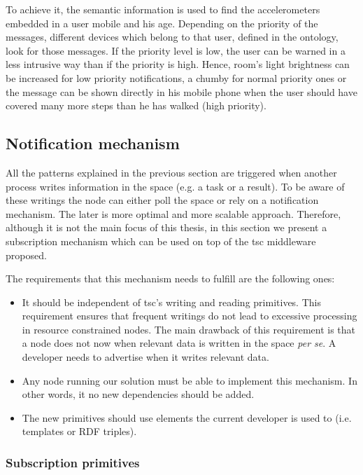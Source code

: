 To achieve it, the semantic information is used to find the accelerometers embedded in a user mobile and his age.
Depending on the priority of the messages, different devices which belong to that user, defined in the ontology, look for those messages.
If the priority level is low, the user can be warned in a less intrusive way than if the priority is high. Hence, room's light brightness can be increased for low priority notifications, a chumby for normal priority ones or the message can be shown directly in his mobile phone when the user should have covered many more steps than he has walked (high priority).




\subsection{Notification mechanism}
\label{sec:notification}

All the patterns explained in the previous section are triggered when another process writes information in the space (e.g. a task or a result).
To be aware of these writings the node can either poll the space or rely on a notification mechanism.
The later is more optimal and more scalable approach.
Therefore, although it is not the main focus of this thesis, in this section we present a subscription mechanism which can be used on top of the \ac{tsc} middleware proposed.

The requirements that this mechanism needs to fulfill are the following ones:
\begin{itemize}
  \item It should be independent of \ac{tsc}'s writing and reading primitives.
	This requirement ensures that frequent writings do not lead to excessive processing in resource constrained nodes.
	The main drawback of this requirement is that a node does not now when relevant data is written in the space \emph{per se}.
	A developer needs to advertise when it writes relevant data.
  \item Any node running our solution must be able to implement this mechanism.
	In other words, it no new dependencies should be added.
  \item The new primitives should use elements the current developer is used to (i.e. templates or RDF triples).
\end{itemize}


\subsubsection{Subscription primitives}

